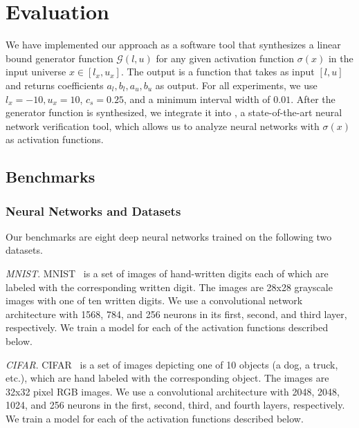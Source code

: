 \section{Evaluation}
\label{offlinesyn:sec:experiment}

We have implemented our approach as a software tool that synthesizes a linear
bound generator function $ \mathcal{G}(l,u) $ for any given activation function
$ \sigma(x) $ in the input universe $ x \in
[l_x, u_x] $. The output is a function that takes as input $ [l, u] $ and
returns
coefficients $ a_l, b_l, a_u, b_u $ as output. For all experiments, we use $ l_x = -10,
u_x = 10 $, $ c_s = 0.25 $, and a minimum interval width of $ 0.01 $.
%
After the generator function is synthesized, we integrate it into
\autolipra{}, a state-of-the-art neural network verification tool, which allows us to analyze neural networks
with $ \sigma(x) $ as activation functions.

\subsection{Benchmarks}


\subsubsection{Neural Networks and Datasets}
Our benchmarks are eight deep neural networks trained on the following two
datasets.

\textit{MNIST}. MNIST~\cite{LecunBBH98} is a set of images of hand-written
digits
each of which are labeled with the corresponding written digit. The images are
28x28 grayscale images with one of ten written digits. We use a convolutional
network architecture with 1568, 784, and 256 neurons in its first, second, and
third layer, respectively. We train a model for each of the activation
functions described below.

\textit{CIFAR}. CIFAR~\cite{krizhevsky2009learning} is a set of images
depicting one of 10
objects (a dog, a truck, etc.), which are hand labeled with the
corresponding object. The images are 32x32 pixel RGB images. We use a
convolutional architecture with 2048, 2048, 1024, and 256 neurons in the first,
second, third, and fourth layers, respectively. We train a model for each of
the activation functions described below.

